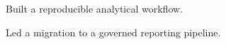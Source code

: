 \documentclass[fontsize=10pt, margin=normal]{careerdossier-resume}
\begin{document}
\MakeCDossierHeader
{}
\begin{CDossierEntry}[
  title        = {Senior Data Scientist},
  organization = {Example Corp},
  location     = {Toronto, ON},
  dates        = {2024--Present}
]
  \begin{CDossierItemize}
    \item Built a reproducible analytical workflow.
    \item Led a migration to a governed reporting pipeline.
  \end{CDossierItemize}
\end{CDossierEntry}
\end{document}

